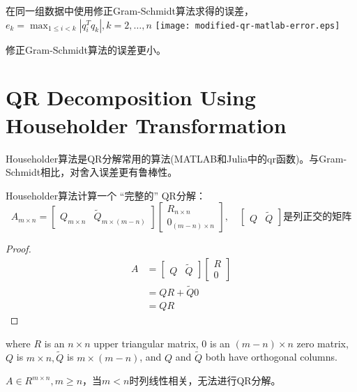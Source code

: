 \begin{example}
\begin{algorithm}[htbp]
{        }
    \end{algorithm}

    \begin{FigureCenter}{在同一组数据中使用修正Gram-Schmidt算法求得的误差，$e_{k}=\max _{1 \leq i<k}\left|q_{i}^{T} q_{k}\right|,  k=2, \ldots, n$}
        \texttt{[image: modified-qr-matlab-error.eps]}
    \end{FigureCenter}

    修正Gram-Schmidt算法的误差更小。
\end{example}

\section{QR Decomposition Using Householder Transformation}

Householder算法是QR分解常用的算法(MATLAB和Julia中的qr函数)。与Gram-Schmidt相比，对舍入误差更有鲁棒性。

Householder算法计算一个 “完整的” QR分解：
$$ A_{m \times n}=\left[\begin{array}{ll}Q_{m \times n} & \tilde{Q}_{m \times (m-n)}\end{array}\right]\left[\begin{array}{l}R_{n  \times  n} \\ 0_{(m-n) \times n}\end{array}\right], \quad\left[\begin{array}{ll}Q & \tilde{Q}\end{array}\right]  是列正交的矩阵$$

\begin{proof}
    $$
    \begin{aligned}
        A&=\left[\begin{array}{ll}Q & \tilde{Q}\end{array}\right]\left[\begin{array}{l}R \\ 0\end{array}\right]\\
        &=QR + \tilde{Q} 0 \\ 
        & = QR
    \end{aligned}
    $$
\end{proof}

where $ R $ is an $ n \times n $ upper triangular matrix, $0$ is an $ (m-n) \times n $ zero matrix, $ Q  $ is $ m \times n,\tilde{Q} $ is $ m \times(m-n) $, and $ Q $ and $ \tilde{Q} $ both have orthogonal columns. 

\begin{remark}
    $A \in R^{m \times n}, m \ge n$，当$m < n$时列线性相关，无法进行QR分解。
\end{remark}



